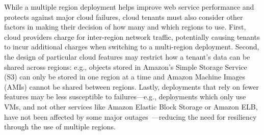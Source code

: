 While a multiple region deployment helps improve web service 
performance and protects against major cloud failures, cloud tenants must
also consider other factors in making their decision of how many and which
regions to use. First, cloud providers charge for inter-region network
traffic, potentially causing tenants to incur additional charges when
switching to a multi-region deployment. Second, the design of particular
cloud features may restrict how a tenant's data can be shared across regions:
e.g., objects stored in Amazon's Simple Storage Service (S3) can only be
stored in one region at a time and Amazon Machine Images (AMIs) cannot be
shared between regions. Lastly, deployments that rely on fewer features may be
less susceptible to failures---e.g., deployments which only use VMs, and not
other services like Amazon Elastic Block Storage or Amazon ELB, have not been
affected by some major 
outages~\cite{AWSoutageOct2012,AWSoutageDec2012}---reducing the need for resiliency through the use of multiple regions.


